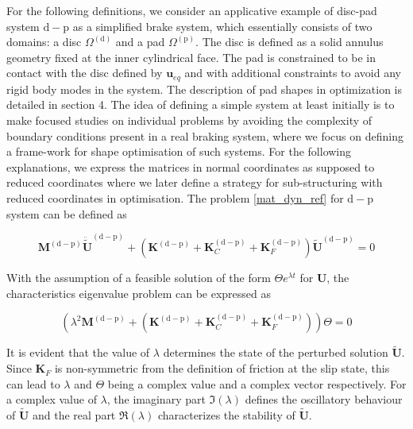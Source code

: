  For the following definitions, we consider an applicative example of disc-pad system $\mathrm{d-p}$ as a simplified brake system, which essentially consists of two domains: a disc $\Omega^{(\mathrm d)}$ and a pad $\Omega^{(\mathrm p)}$. The disc is defined as a solid annulus geometry fixed at the inner cylindrical face. The pad is constrained to be in contact with the disc defined by $\bm u_{eq}$ and with additional constraints to avoid any rigid body modes in the system. The description of pad shapes in optimization is detailed in section 4. The idea of defining a simple system at least initially is to make focused studies on individual problems by avoiding the complexity of boundary conditions present in a real braking system, where we focus on defining a frame-work for shape optimisation of such systems. For the following explanations, we express the matrices in normal coordinates as supposed to reduced coordinates where we later define a strategy for sub-structuring with reduced coordinates in optimisation. The problem \eqref{mat_dyn_ref} for $\mathrm{d-p}$ system can be defined as
 
\begin{equation} 
\mathbf{M}^{\mathrm{(d-p)}}{\bm {\ddot{\widetilde U}}}^{\mathrm{(d-p)}}+(\mathbf{K}^{\mathrm{(d-p)}}+\mathbf{K}_C^{\mathrm{(d-p)}}+\mathbf{K}_F^{\mathrm{(d-p)}})\bm{\widetilde U}^{\mathrm{(d-p)}}=0  
\label{eq:system1}
\end{equation} 

With the assumption of a feasible solution of the form $\Theta e^{\lambda t}$ for $\bm U$, the characteristics eigenvalue problem can be expressed as 

\begin{equation} \label{eq:char_eqn}
 (\lambda^{2} \mathbf{M}^{\mathrm{(d-p)}}+(\mathbf{K}^{\mathrm{(d-p)}}+\mathbf{K}_{C}^{\mathrm{(d-p)}}+\mathbf{K}_{F}^{\mathrm{(d-p)}})) \Theta =0
\end{equation}

It is evident that the value of $\lambda$ determines the state of the perturbed solution $\bm{\widetilde U}$. 
Since $\mathbf{K}_F$ is non-symmetric from the definition of friction at the slip state, this can lead to $\lambda$ and $\Theta$ being a complex value and a complex vector respectively. For a complex value of $\lambda$, the imaginary part $\Im(\lambda)$ defines the oscillatory behaviour of $\bm{\widetilde U}$ and the real part $\Re(\lambda)$ characterizes the stability of $\bm{\widetilde U}$.\\

